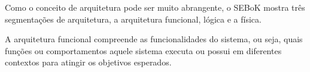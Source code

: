 	Como o conceito de arquitetura pode ser muito abrangente, o SEBoK \citep{sebok2024} mostra três segmentações de arquitetura, a arquitetura funcional,	lógica e a física.

	A arquitetura funcional compreende as funcionalidades do sistema, ou seja, quais funções ou comportamentos aquele sistema executa ou possui em diferentes contextos para atingir os objetivos
	esperados.